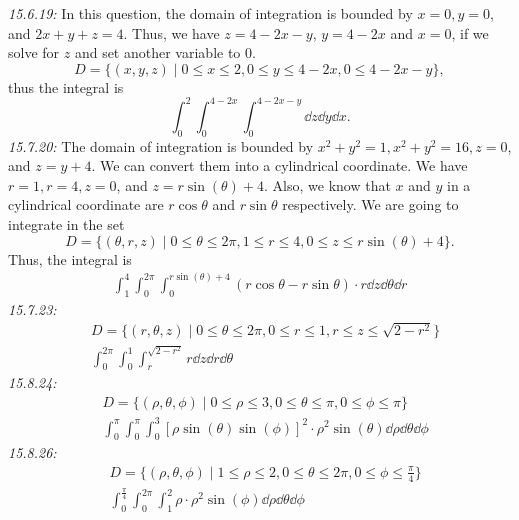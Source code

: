 \documentclass[8pt,twocolumn]{article}
\begin{document}
\begin{Answer}[number=19]
  \emph{15.6.19:}
  In this question, the domain of integration is bounded by $x=0, y=0$, and
  $2x+y+z=4$. Thus, we have $z=4-2x-y$, $y=4-2x$ and $x=0$, if we solve for $z$
  and set another variable to $0$.
  \[D = \{(x,y,z) \mid 0\le x\le 2, 0\le y\le 4-2x, 0\le 4-2x-y\},\] thus the
  integral is
  \[\int_0^2\int_0^{4-2x}\int_0^{4-2x-y}\dd{z}\dd{y}\dd{x}.\]
  \emph{15.7.20:}
  The domain of integration is bounded by $x^2+y^2=1, x^2+y^2=16, z=0$, and
  $z=y+4$. We can convert them into a cylindrical coordinate. We have $r=1,
  r=4, z=0$, and $z=r\sin(\theta)+4$. Also, we know that $x$ and $y$ in a
  cylindrical coordinate are $r\cos\theta$ and $r\sin\theta$ respectively. We
  are going to integrate in the set
  \[
    D = \{(\theta, r, z) \mid 0\le\theta\le2\pi, 1\le r\le4, 0\le z\le
    r\sin(\theta)+4\}.
  \]
  Thus, the integral is
  \begin{align*}
    \int_1^4\int_0^{2\pi}\int_0^{r\sin(\theta)+4} (r\cos\theta-
    r\sin\theta)\cdot r\dd{z}\dd{\theta}\dd{r}
  \end{align*}
  \emph{15.7.23:}
  \begin{align*}
    &D = \{(r,\theta,z) \mid 0\le \theta\le2\pi, 0\le r\le 1, r\le z\le
    \sqrt{2-r^2}\} \\
    &\int_0^{2\pi}\int_0^1\int_r^{\sqrt{2-r^2}} r\dd{z}\dd{r}\dd{\theta}
  \end{align*}
  \emph{15.8.24:}
  \begin{align*}
    &D = \{(\rho, \theta, \phi) \mid 0\le \rho \le 3, 0\le
    \theta\le \pi, 0\le\phi\le \pi \} \\
    &\int_0^{\pi}\int_{0}^{\pi}\int_0^3
    \left[\rho\sin(\theta)\sin(\phi)\right]^2\cdot\rho^2\sin(\theta) \dd{\rho}\dd{\theta}\dd{\phi}
  \end{align*}
  \emph{15.8.26:}
  \begin{align*}
    &D = \{(\rho, \theta, \phi)\mid1\le\rho\le2, 0\le\theta\le2\pi,
    0\le\phi\le\frac{\pi}{4}\} \\
    &\int_0^{\frac{\pi}{4}}\int_0^{2\pi}\int_1^2 \rho \cdot \rho^2\sin(\phi) \dd{\rho}\dd{\theta}\dd{\phi}
  \end{align*}
\end{Answer}
\end{document}
